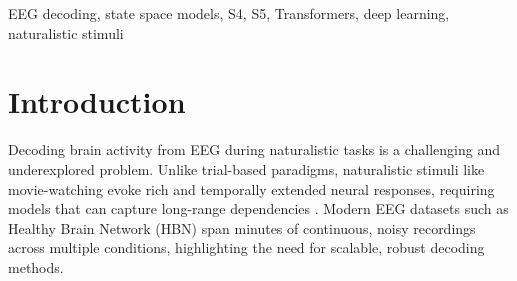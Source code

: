\documentclass{article}
\newcommand{\eegtrans}{EEGXF}
\begin{document}
\begin{abstract}
We investigate how model architecture and temporal context interact in naturalistic EEG decoding. Using the Healthy Brain Network dataset, we benchmark five architectures, CNN, LSTM, Transformer, \eegtrans (a modernized EEG Transformer), and S5 (a structured state space model), on a 4-class movie classification task across segment lengths from 8s to 256s. While CNNs perform well on short segments, S5 consistently outperforms in accuracy and training efficiency, particularly at longer durations. In subject-mixed splits, it reaches near-perfect accuracy on 256s segments, demonstrating its capacity for long-range temporal modeling. 

To assess real-world generalization, we conduct zero-shot cross-frequency evaluations and leave-one-subject-out (LOSO) testing. These reveal substantial performance drops, especially for S5, highlighting the challenge of subject-independent and frequency-robust EEG decoding. We also compare model efficiency and robustness, showing that S5 offers unmatched speed while \eegtrans is more stable across sampling rates. Our results provide practical insights for selecting EEG models under different generalization and efficiency constraints. We release all code, pretrained models, and training logs to ensure full reproducibility.
\end{abstract}


%
\begin{IEEEkeywords}
EEG decoding, state space models, S4, S5, Transformers, deep learning, naturalistic stimuli
\end{IEEEkeywords}
%


\section{Introduction}
\label{sec:intro}

Decoding brain activity from EEG during naturalistic tasks is a challenging and underexplored problem. Unlike trial-based paradigms, naturalistic stimuli like movie-watching evoke rich and temporally extended neural responses, requiring models that can capture long-range dependencies \cite{shirazi2024hbn}. Modern EEG datasets such as Healthy Brain Network (HBN) span minutes of continuous, noisy recordings across multiple conditions, highlighting the need for scalable, robust decoding methods.
\end{document}
